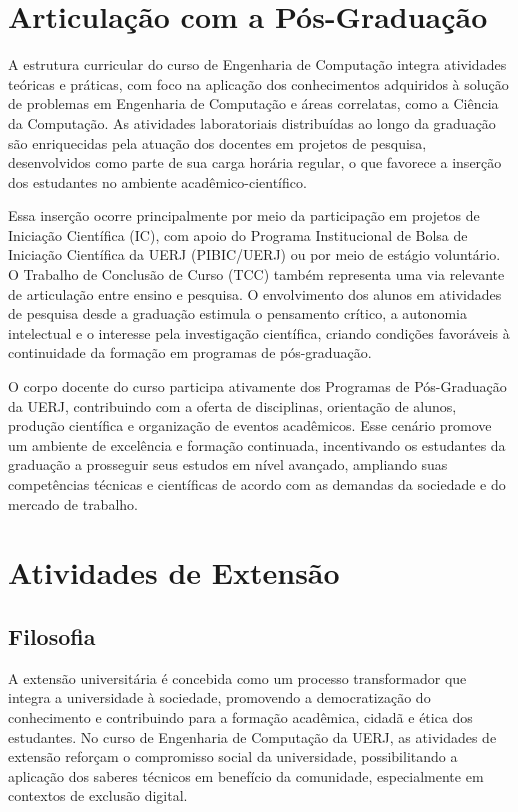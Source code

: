 \section{Articulação com a Pós-Graduação }

A estrutura curricular do curso de Engenharia de Computação integra atividades teóricas e práticas, com foco na aplicação dos conhecimentos adquiridos à solução de problemas em Engenharia de Computação e áreas correlatas, como a Ciência da Computação. As atividades laboratoriais distribuídas ao longo da graduação são enriquecidas pela atuação dos docentes em projetos de pesquisa, desenvolvidos como parte de sua carga horária regular, o que favorece a inserção dos estudantes no ambiente acadêmico-científico.

Essa inserção ocorre principalmente por meio da participação em projetos de Iniciação Científica (IC), com apoio do Programa Institucional de Bolsa de Iniciação Científica da UERJ (PIBIC/UERJ) ou por meio de estágio voluntário. O Trabalho de Conclusão de Curso (TCC) também representa uma via relevante de articulação entre ensino e pesquisa. O envolvimento dos alunos em atividades de pesquisa desde a graduação estimula o pensamento crítico, a autonomia intelectual e o interesse pela investigação científica, criando condições favoráveis à continuidade da formação em programas de pós-graduação.

O corpo docente do curso participa ativamente dos Programas de Pós-Graduação da UERJ, contribuindo com a oferta de disciplinas, orientação de alunos, produção científica e organização de eventos acadêmicos. Esse cenário promove um ambiente de excelência e formação continuada, incentivando os estudantes da graduação a prosseguir seus estudos em nível avançado, ampliando suas competências técnicas e científicas de acordo com as demandas da sociedade e do mercado de trabalho.

\section{Atividades de Extensão}

\subsection{Filosofia}
A extensão universitária é concebida como um processo transformador que integra a universidade à sociedade, promovendo a democratização do conhecimento e contribuindo para a formação acadêmica, cidadã e ética dos estudantes. No curso de Engenharia de Computação da UERJ, as atividades de extensão reforçam o compromisso social da universidade, possibilitando a aplicação dos saberes técnicos em benefício da comunidade, especialmente em contextos de exclusão digital.

